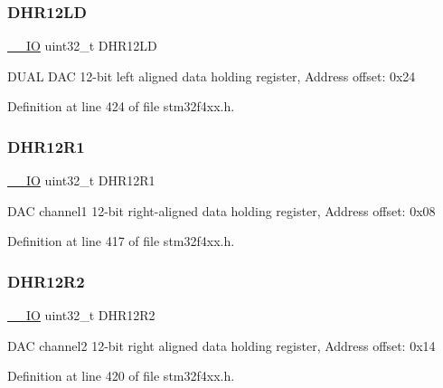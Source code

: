 \subsubsection{\texorpdfstring{D\+H\+R12\+LD}{DHR12LD}}
{\footnotesize\ttfamily \hyperlink{group___c_m_s_i_s__core__definitions_gaec43007d9998a0a0e01faede4133d6be}{\+\_\+\+\_\+\+IO} uint32\+\_\+t D\+H\+R12\+LD}

D\+U\+AL D\+AC 12-\/bit left aligned data holding register, Address offset\+: 0x24 

Definition at line 424 of file stm32f4xx.\+h.

\mbox{\label{struct_d_a_c___type_def_ac2bb55b037b800a25852736afdd7a258}} 
\subsubsection{\texorpdfstring{D\+H\+R12\+R1}{DHR12R1}}
{\footnotesize\ttfamily \hyperlink{group___c_m_s_i_s__core__definitions_gaec43007d9998a0a0e01faede4133d6be}{\+\_\+\+\_\+\+IO} uint32\+\_\+t D\+H\+R12\+R1}

D\+AC channel1 12-\/bit right-\/aligned data holding register, Address offset\+: 0x08 

Definition at line 417 of file stm32f4xx.\+h.

\mbox{\label{struct_d_a_c___type_def_a804c7e15dbb587c7ea25511f6a7809f7}} 
\subsubsection{\texorpdfstring{D\+H\+R12\+R2}{DHR12R2}}
{\footnotesize\ttfamily \hyperlink{group___c_m_s_i_s__core__definitions_gaec43007d9998a0a0e01faede4133d6be}{\+\_\+\+\_\+\+IO} uint32\+\_\+t D\+H\+R12\+R2}

D\+AC channel2 12-\/bit right aligned data holding register, Address offset\+: 0x14 

Definition at line 420 of file stm32f4xx.\+h.

\mbox{\label{struct_d_a_c___type_def_a1590b77e57f17e75193da259da72095e}} 
